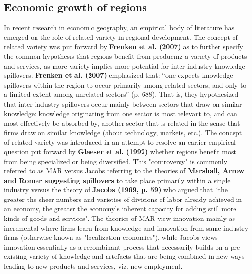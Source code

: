 \subsection{Economic growth of regions}

In recent research in economic geography, an empirical body of literature has emerged on the role of related variety in regional development. The concept of related variety was put forward by \textbf{Frenken et al. (2007) }as to further specify the common hypothesis that regions benefit from producing a variety of products and services, as more variety implies more potential for inter-industry knowledge spillovers. \textbf{Frenken et al. (2007)} emphasized that: “one expects knowledge spillovers within the region to occur primarily among related sectors, and only to a limited extent among unrelated sectors” (p. 688). That is, they hypothesized that inter-industry spillovers occur mainly between sectors that draw on similar knowledge: knowledge originating from one sector is most relevant to, and can most effectively be absorbed by, another sector that is related in the sense that firms draw on similar knowledge (about technology, markets, etc.).
The concept of related variety was introduced in an attempt to resolve an earlier empirical question put forward by \textbf{Glaeser et al. (1992)} whether regions benefit most from being specialized or being diversified. This "controversy" is commonly referred to as MAR versus Jacobs referring to the theories of \textbf{Marshall, Arrow and Romer suggesting spillovers} to take place primarily within a single industry versus the theory of \textbf{Jacobs (1969, p. 59) }who argued that “the greater the sheer numbers and varieties of divisions of labor already achieved in an economy, the greater the economy’s inherent capacity for adding still more kinds of goods and services". The theories of MAR view innovation mainly as incremental where firms learn from knowledge and innovation from same-industry firms (otherwise known as "localization economies"), while Jacobs views innovation essentially as a recombinant process that necessarily builds on a pre-existing variety of knowledge and artefacts that are being combined in new ways leading to new products and services, viz. new employment.



